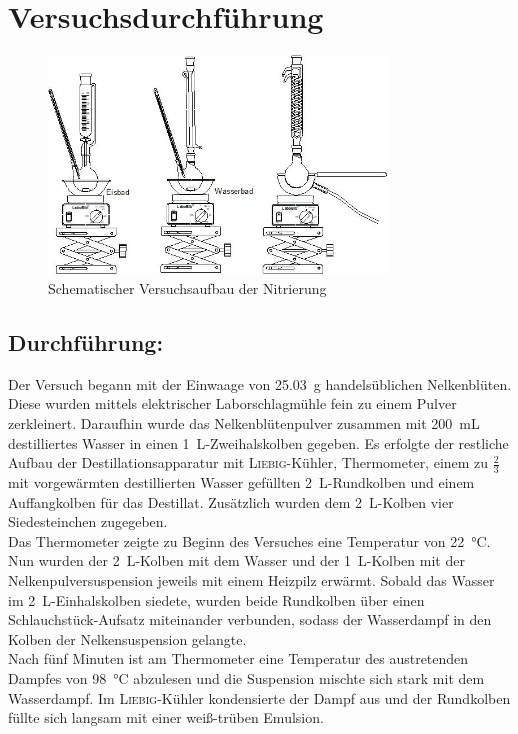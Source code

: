 \section{Versuchsdurchführung}
\label{sec:durchfuerung}

\begin{figure}[h!]
	\centering
	\includegraphics[width=0.8\textwidth]{img/versuchsaufbau}
	\caption{Schematischer Versuchsaufbau der Nitrierung}
	\label{fig:versuchsaufbau}
\end{figure}
\FloatBarrier
\vspace*{-5mm}

\subsection*{Durchführung:}
Der Versuch begann mit der Einwaage von \SI{25,03}{\gram} handelsüblichen Nelkenblüten. Diese wurden mittels elektrischer Laborschlagmühle fein zu einem Pulver zerkleinert.
Daraufhin wurde das Nelkenblütenpulver zusammen mit \SI{200 }{\milli \liter} destilliertes Wasser in einen \SI{1}{\liter}-Zweihalskolben gegeben.
Es erfolgte der restliche Aufbau der Destillationsapparatur mit \textsc{ Liebig}-Kühler, Thermometer, einem zu $\frac{2}{3}$ mit vorgewärmten destillierten Wasser gefüllten \SI{2}{\liter}-Rundkolben und einem Auffangkolben für das Destillat.
Zusätzlich wurden dem \SI{2}{\liter}-Kolben vier Siedesteinchen zugegeben.\\
Das Thermometer zeigte zu Beginn des Versuches eine Temperatur von \SI{22}{\celsius}.\\
Nun wurden der \SI{2}{\liter}-Kolben mit dem Wasser und der \SI{1}{\liter}-Kolben mit der Nelkenpulversuspension jeweils mit einem Heizpilz erwärmt.
Sobald das Wasser im \SI{2}{\liter}-Einhalskolben siedete, wurden beide Rundkolben über einen Schlauchstück-Aufsatz miteinander verbunden, sodass der Wasserdampf in den Kolben der Nelkensuspension gelangte.\\
Nach fünf Minuten ist am Thermometer eine Temperatur des austretenden Dampfes von \SI{98}{\celsius} abzulesen und die Suspension mischte sich stark mit dem Wasserdampf.
Im \textsc{Liebig}-Kühler kondensierte der Dampf aus und der Rundkolben füllte sich langsam mit einer weiß-trüben Emulsion.\\

